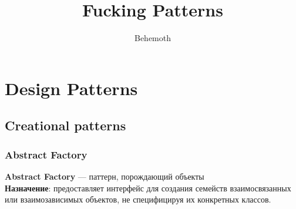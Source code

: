 \documentclass[a3paper,11pt]{report}
\author{Behemoth}
\title{Fucking Patterns}
\begin{document}
\tableofcontents
\usetikzlibrary{calc}

\newpage
\chapter{Design Patterns}
\newpage
\section{Creational patterns}
\subsection{Abstract Factory}
	\large\textbf{Abstract Factory} --- паттерн, порождающий объекты\\
	\large\textbf{Назначение}: предоставляет интерфейс для создания семейств взаимосвязанных или взаимозависимых объектов, не специфицируя их конкретных классов.
\\
\end{document}
